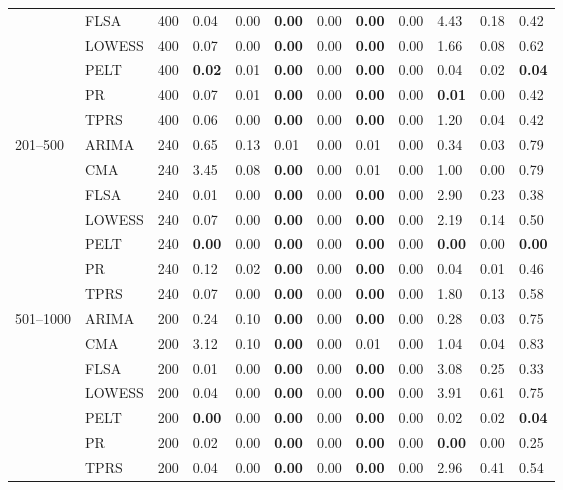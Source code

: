 \begin{table}[ht]
\begin{tabular}{llrlrlrlrlrl}
   & FLSA & 400 & 0.04 & 0.00 & \textbf{0.00} & 0.00 & \textbf{0.00} & 0.00 & 4.43 & 0.18 & 0.42 \\ 
   & LOWESS & 400 & 0.07 & 0.00 & \textbf{0.00} & 0.00 & \textbf{0.00} & 0.00 & 1.66 & 0.08 & 0.62 \\ 
   & PELT & 400 & \textbf{0.02} & 0.01 & \textbf{0.00} & 0.00 & \textbf{0.00} & 0.00 & 0.04 & 0.02 & \textbf{0.04} \\ 
   & PR & 400 & 0.07 & 0.01 & \textbf{0.00} & 0.00 & \textbf{0.00} & 0.00 & \textbf{0.01} & 0.00 & 0.42 \\ 
   & TPRS & 400 & 0.06 & 0.00 & \textbf{0.00} & 0.00 & \textbf{0.00} & 0.00 & 1.20 & 0.04 & 0.42 \\ 
  201–500 & ARIMA & 240 & 0.65 & 0.13 & 0.01 & 0.00 & 0.01 & 0.00 & 0.34 & 0.03 & 0.79 \\ 
   & CMA & 240 & 3.45 & 0.08 & \textbf{0.00} & 0.00 & 0.01 & 0.00 & 1.00 & 0.00 & 0.79 \\ 
   & FLSA & 240 & 0.01 & 0.00 & \textbf{0.00} & 0.00 & \textbf{0.00} & 0.00 & 2.90 & 0.23 & 0.38 \\ 
   & LOWESS & 240 & 0.07 & 0.00 & \textbf{0.00} & 0.00 & \textbf{0.00} & 0.00 & 2.19 & 0.14 & 0.50 \\ 
   & PELT & 240 & \textbf{0.00} & 0.00 & \textbf{0.00} & 0.00 & \textbf{0.00} & 0.00 & \textbf{0.00} & 0.00 & \textbf{0.00} \\ 
   & PR & 240 & 0.12 & 0.02 & \textbf{0.00} & 0.00 & \textbf{0.00} & 0.00 & 0.04 & 0.01 & 0.46 \\ 
   & TPRS & 240 & 0.07 & 0.00 & \textbf{0.00} & 0.00 & \textbf{0.00} & 0.00 & 1.80 & 0.13 & 0.58 \\ 
  501–1000 & ARIMA & 200 & 0.24 & 0.10 & \textbf{0.00} & 0.00 & \textbf{0.00} & 0.00 & 0.28 & 0.03 & 0.75 \\ 
   & CMA & 200 & 3.12 & 0.10 & \textbf{0.00} & 0.00 & 0.01 & 0.00 & 1.04 & 0.04 & 0.83 \\ 
   & FLSA & 200 & 0.01 & 0.00 & \textbf{0.00} & 0.00 & \textbf{0.00} & 0.00 & 3.08 & 0.25 & 0.33 \\ 
   & LOWESS & 200 & 0.04 & 0.00 & \textbf{0.00} & 0.00 & \textbf{0.00} & 0.00 & 3.91 & 0.61 & 0.75 \\ 
   & PELT & 200 & \textbf{0.00} & 0.00 & \textbf{0.00} & 0.00 & \textbf{0.00} & 0.00 & 0.02 & 0.02 & \textbf{0.04} \\ 
   & PR & 200 & 0.02 & 0.00 & \textbf{0.00} & 0.00 & \textbf{0.00} & 0.00 & \textbf{0.00} & 0.00 & 0.25 \\ 
   & TPRS & 200 & 0.04 & 0.00 & \textbf{0.00} & 0.00 & \textbf{0.00} & 0.00 & 2.96 & 0.41 & 0.54 \\ 

\end{tabular}
\end{table}
